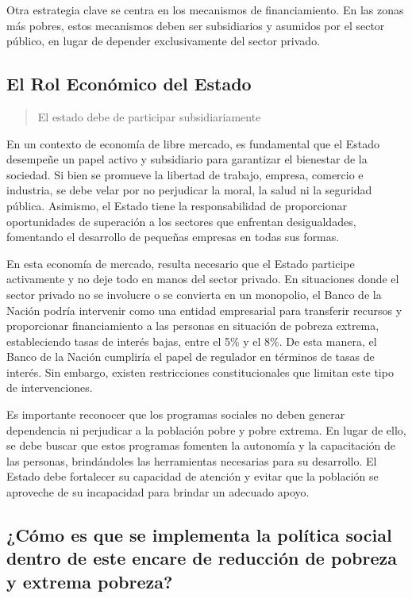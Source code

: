 \documentclass[
  letterpaper,
  DIV=11,
  numbers=noendperiod]{scrartcl}
\begin{document}
Otra estrategia clave se centra en los mecanismos de financiamiento. En
las zonas más pobres, estos mecanismos deben ser subsidiarios y asumidos
por el sector público, en lugar de depender exclusivamente del sector
privado.

\hypertarget{el-rol-econuxf3mico-del-estado}{%
\subsection{El Rol Económico del
Estado}\label{el-rol-econuxf3mico-del-estado}}

\begin{quote}
El estado debe de participar subsidiariamente
\end{quote}

En un contexto de economía de libre mercado, es fundamental que el
Estado desempeñe un papel activo y subsidiario para garantizar el
bienestar de la sociedad. Si bien se promueve la libertad de trabajo,
empresa, comercio e industria, se debe velar por no perjudicar la moral,
la salud ni la seguridad pública. Asimismo, el Estado tiene la
responsabilidad de proporcionar oportunidades de superación a los
sectores que enfrentan desigualdades, fomentando el desarrollo de
pequeñas empresas en todas sus formas.

En esta economía de mercado, resulta necesario que el Estado participe
activamente y no deje todo en manos del sector privado. En situaciones
donde el sector privado no se involucre o se convierta en un monopolio,
el Banco de la Nación podría intervenir como una entidad empresarial
para transferir recursos y proporcionar financiamiento a las personas en
situación de pobreza extrema, estableciendo tasas de interés bajas,
entre el 5\% y el 8\%. De esta manera, el Banco de la Nación cumpliría
el papel de regulador en términos de tasas de interés. Sin embargo,
existen restricciones constitucionales que limitan este tipo de
intervenciones.

Es importante reconocer que los programas sociales no deben generar
dependencia ni perjudicar a la población pobre y pobre extrema. En lugar
de ello, se debe buscar que estos programas fomenten la autonomía y la
capacitación de las personas, brindándoles las herramientas necesarias
para su desarrollo. El Estado debe fortalecer su capacidad de atención y
evitar que la población se aproveche de su incapacidad para brindar un
adecuado apoyo.

\hypertarget{cuxf3mo-es-que-se-implementa-la-poluxedtica-social-dentro-de-este-encare-de-reducciuxf3n-de-pobreza-y-extrema-pobreza}{%
\subsection{¿Cómo es que se implementa la política social dentro de este
encare de reducción de pobreza y extrema
pobreza?}\label{cuxf3mo-es-que-se-implementa-la-poluxedtica-social-dentro-de-este-encare-de-reducciuxf3n-de-pobreza-y-extrema-pobreza}}
\end{document}

